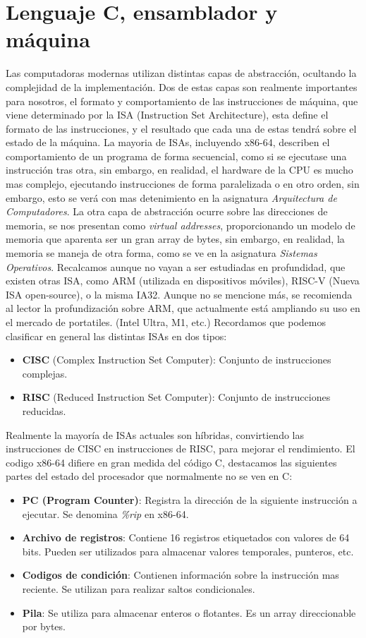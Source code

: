 \section{Lenguaje C, ensamblador y máquina}
Las computadoras modernas utilizan distintas capas de abstracción, ocultando la complejidad
de la implementación. Dos de estas capas son realmente importantes para nosotros,
el formato y comportamiento de las instrucciones de máquina, que viene determinado
por la ISA (Instruction Set Architecture), esta define el formato de las instrucciones,
y el resultado que cada una de estas tendrá sobre el estado de la máquina.
La mayoria de ISAs, incluyendo x86-64, describen el comportamiento de un programa de
forma secuencial, como si se ejecutase una instrucción tras otra, sin embargo, en realidad,
el hardware de la CPU es mucho mas complejo, ejecutando instrucciones de forma paralelizada
o en otro orden, sin embargo, esto se verá con mas detenimiento en la asignatura \textit{Arquitectura de Computadores}.
La otra capa de abstracción ocurre sobre las direcciones de memoria, se nos presentan
como \textit{virtual addresses}, proporcionando un modelo de memoria que aparenta ser
un gran array de bytes, sin embargo, en realidad, la memoria se maneja de otra forma,
como se ve en la asignatura \textit{Sistemas Operativos}.
Recalcamos aunque no vayan a ser estudiadas en profundidad, que existen otras
ISA, como ARM (utilizada en dispositivos móviles), RISC-V (Nueva ISA open-source),
o la misma IA32. Aunque no se mencione más, se recomienda al lector la profundización
sobre ARM, que actualmente está ampliando su uso en el mercado de portatiles. (Intel Ultra, M1, etc.)
Recordamos que podemos clasificar en general las distintas ISAs en dos tipos:
\begin{itemize}
	\item \textbf{CISC} (Complex Instruction Set Computer): Conjunto de instrucciones complejas.
	\item \textbf{RISC} (Reduced Instruction Set Computer): Conjunto de instrucciones reducidas.
\end{itemize}
Realmente la mayoría de ISAs actuales son híbridas, convirtiendo
las instrucciones de CISC en instrucciones de RISC, para mejorar el rendimiento.
\newline
\newline
El codigo x86-64 difiere en gran medida del código C, destacamos las siguientes
partes del estado del procesador que normalmente no se ven en C:
\begin{itemize}
	\item \textbf{PC (Program Counter)}: Registra la dirección de la siguiente instrucción a ejecutar.
	      Se denomina \textit{\%rip} en x86-64.
	\item \textbf{Archivo de registros}: Contiene 16 registros etiquetados con valores de 64 bits.
	      Pueden ser utilizados para almacenar valores temporales, punteros, etc.
	\item \textbf{Codigos de condición}: Contienen información sobre la instrucción mas reciente.
	      Se utilizan para realizar saltos condicionales.
	\item \textbf{Pila}: Se utiliza para almacenar enteros o flotantes. Es un array direccionable por bytes.
\end{itemize}
